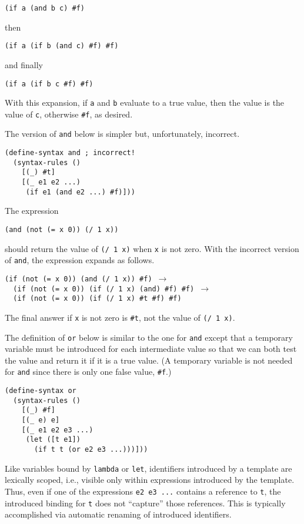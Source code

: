 \texttt{(if a (and b c) \#{}f)}

then


\texttt{(if a (if b (and c) \#{}f) \#{}f)}

and finally


\texttt{(if a (if b c \#{}f) \#{}f)}

With this expansion, if \texttt{a} and \texttt{b} evaluate to a true value, then the value
is the value of \texttt{c}, otherwise \texttt{\#{}f}, as desired.


The version of \texttt{and} below is simpler but, unfortunately,
incorrect.


\begin{alltt}
(define-syntax and ; incorrect!
  (syntax-rules ()
    [(\_{}) \#{}t]
    [(\_{} e1 e2 ...)
     (if e1 (and e2 ...) \#{}f)]))
\end{alltt}


The expression


\texttt{(and (not (= x 0)) (/ 1 x))}

should return the value of \texttt{(/ 1 x)} when \texttt{x}
is not zero.
With the incorrect version of \texttt{and}, the expression expands
as follows.


\begin{alltt}
(if (not (= x 0)) (and (/ 1 x)) \#{}f) \(\rightarrow\)
  (if (not (= x 0)) (if (/ 1 x) (and) \#{}f) \#{}f) \(\rightarrow\)
  (if (not (= x 0)) (if (/ 1 x) \#{}t \#{}f) \#{}f)
\end{alltt}


The final answer if \texttt{x} is not zero is \texttt{\#{}t}, not the
value of \texttt{(/ 1 x)}.


The definition of \label{further_s23}\texttt{or} below is similar to the one for \texttt{and} except
that a temporary variable must be introduced for each intermediate
value so that we can both test the value and return it if it is a
true value.
(A temporary variable is not needed for \texttt{and} since there is only one
false value, \texttt{\#{}f}.)


\begin{alltt}
(define-syntax or\label{further_defn_or}
  (syntax-rules ()
    [(\_{}) \#{}f]
    [(\_{} e) e]
    [(\_{} e1 e2 e3 ...)
     (let ([t e1])
       (if t t (or e2 e3 ...)))]))
\end{alltt}


Like variables bound by \texttt{lambda} or \texttt{let}, identifiers introduced
by a template are \label{further_s24}lexically scoped, i.e., visible only within
expressions introduced by the template.
Thus, even if one of the expressions \texttt{e2 e3 ...} contains a reference
to \texttt{t}, the introduced binding for \texttt{t} does not ``capture'' those
references.
This is typically accomplished via automatic renaming of introduced
identifiers.


